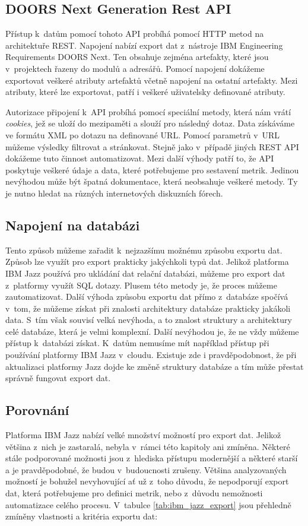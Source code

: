 \documentclass[czech,master]{diploma}
\begin{document}
\subsection{DOORS Next Generation Rest API}
Přístup k~datům pomocí tohoto API probíhá pomocí HTTP metod na architektuře REST. Napojení nabízí export dat z~nástroje IBM Engineering Requirements DOORS Next. Ten obsahuje zejména artefakty, které jsou v~projektech řazeny do modulů a adresářů. Pomocí napojení dokážeme exportovat veškeré atributy artefaktů včetně napojení na ostatní artefakty. Mezi atributy, které lze exportovat, patří i veškeré uživatelsky definované atributy.

Autorizace připojení k~API probíhá pomocí speciální metody, která nám vrátí \textit{cookies}, jež se uloží do mezipaměti a slouží pro následný dotaz. Data získáváme ve formátu XML po dotazu na definované URL. Pomocí parametrů v~URL můžeme výsledky filtrovat a stránkovat. Stejně jako v~případě jiných REST API dokážeme tuto činnost automatizovat. Mezi další výhody patří to, že API poskytuje veškeré údaje a data, které potřebujeme pro sestavení metrik. Jedinou nevýhodou může být špatná dokumentace, která neobsahuje veškeré metody. Ty je nutno hledat na různých internetových diskuzních fórech.

\subsection{Napojení na databázi}
Tento způsob můžeme zařadit k~nejzazšímu možnému způsobu exportu dat. Způsob lze využít pro export prakticky jakýchkoli typů dat. Jelikož platforma IBM Jazz používá pro ukládání dat relační databázi, můžeme pro export dat z~platformy využít SQL dotazy. Plusem této metody je, že proces můžeme zautomatizovat. Další výhoda způsobu exportu dat přímo z~databáze spočívá v~tom, že můžeme získat při znalosti architektury databáze prakticky jakákoli data. S~tím však souvisí velká nevýhoda, a to znalost struktury a architektury celé databáze, která je velmi komplexní. Další nevýhodou je, že ne vždy můžeme přístup k~databázi získat. K~datům nemusíme mít například přístup při používání platformy IBM Jazz v~cloudu. Existuje zde i pravděpodobnost, že při aktualizaci platformy Jazz dojde ke změně struktury databáze a tím může přestat správně fungovat export dat.

\subsection{Porovnání}
Platforma IBM Jazz nabízí velké množství možností pro export dat. Jelikož většina z~nich je zastaralá, nebyla v~rámci této kapitoly ani zmíněna. Některé stále podporované možnosti jsou z~hlediska přístupu modernější a některé starší a je pravděpodobné, že budou v~budoucnosti zrušeny. Většina analyzovaných možností je bohužel nevyhovující ať už z~toho důvodu, že nepodporují export dat, která potřebujeme pro definici metrik, nebo z~důvodu nemožnosti automatizace celého procesu. V~tabulce \ref{tab:ibm_jazz_export} jsou přehledně zmíněny vlastnosti a kritéria exportu dat:
\end{document}
